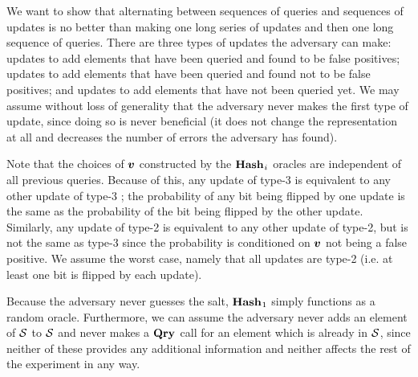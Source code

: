 {We want to show that alternating between sequences of queries and sequences of
updates is no better than making one long series of updates and then one long
sequence of queries. There are three types of updates the adversary can make:
updates to add elements that have been queried and found to be false positives;
updates to add elements that have been queried and found not to be false
positives; and updates to add elements that have not been queried yet. We may
assume without loss of generality that the adversary never makes the first type
of update, since doing so is never beneficial (it does not change the
representation at all and decreases the number of errors the adversary has
found). 

Note that the choices of $\boldsymbol{v}$ constructed by the $\textup{\textbf{Hash}}\hspace{0.5pt}_i$ oracles are
independent of all previous queries. Because of this, any update of type-3 is
equivalent to any other update of type-3%
%
%
%
; the probability of any bit being flipped by one update is the same as the
probability of the bit being flipped by the other update. Similarly, any update
of type-2 is equivalent to any other update of type-2, but is not the same as
type-3 since the probability is conditioned on $\boldsymbol{v}$ not being a false positive.
We assume the worst case, namely that all updates are type-2 (i.e. at least one
bit is flipped by each update).

Because the adversary never guesses the salt, $\textup{\textbf{Hash}}\hspace{0.5pt}_1$ simply functions as a
random oracle.
%
%
Furthermore, we can assume the adversary never adds an element of
$\mathcal{S}$ to $\mathcal{S}$%
%
%
and never makes a $\textup{\textbf{Qry}}\hspace{0.5pt}$ call for an element which is already
in $\mathcal{S}$, since neither of these provides any additional information and
neither affects the rest of the experiment in any way.

}

